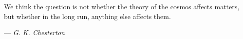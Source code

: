\begin{titlepage}
\clearpage

\thispagestyle{empty}
\vspace*{7em}
\begin{center}
\begin{minipage}{6in}
\begin{center}
We think the question is not whether the theory of the cosmos affects matters, \\ but whether in the long run, anything else affects them.
\end{center}
\hfill --- \textit{G. K. Chesterton}
\end{minipage}
\end{center}

\clearpage

\endgroup
\end{titlepage}
